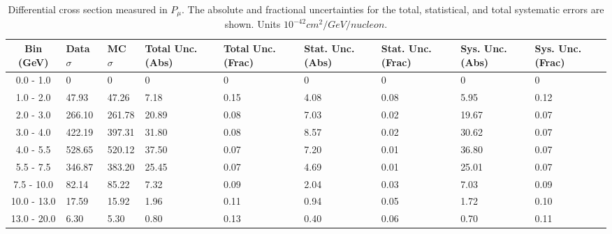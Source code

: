 \begin{table}[!htb]
    \centering
    \tiny
    \begin{tabular}{|c|p{0.5in}|p{0.5in}|p{0.5in}|p{0.5in}|p{0.5in}|p{0.5in}|p{0.5in}|p{0.5in}|}
        \hline
        Bin (GeV)& Data $\sigma$ & MC $\sigma$ & Total Unc. (Abs) & Total Unc. (Frac)  & Stat. Unc. (Abs) & Stat. Unc. (Frac) & Sys. Unc. (Abs) & Sys. Unc. (Frac)\\ \hline
0.0 - 1.0 & 0 & 0 & 0 & 0 & 0 & 0 & 0 & 0\\ \hline
1.0 - 2.0 & 47.93 & 47.26 & 7.18 & 0.15 & 4.08 & 0.08 & 5.95 & 0.12\\ \hline
2.0 - 3.0 & 266.10 & 261.78 & 20.89 & 0.08 & 7.03 & 0.02 & 19.67 & 0.07\\ \hline
3.0 - 4.0 & 422.19 & 397.31 & 31.80 & 0.08 & 8.57 & 0.02 & 30.62 & 0.07\\ \hline
4.0 - 5.5 & 528.65 & 520.12 & 37.50 & 0.07 & 7.20 & 0.01 & 36.80 & 0.07\\ \hline
5.5 - 7.5 & 346.87 & 383.20 & 25.45 & 0.07 & 4.69 & 0.01 & 25.01 & 0.07\\ \hline
7.5 - 10.0 & 82.14 & 85.22 & 7.32 & 0.09 & 2.04 & 0.03 & 7.03 & 0.09\\ \hline
10.0 - 13.0 & 17.59 & 15.92 & 1.96 & 0.11 & 0.94 & 0.05 & 1.72 & 0.10\\ \hline
13.0 - 20.0 & 6.30 & 5.30 & 0.80 & 0.13 & 0.40 & 0.06 & 0.70 & 0.11\\ \hline


    \end{tabular}
    \caption{Differential cross section measured in $P_\mu$. The absolute and fractional uncertainties for the total, statistical, and total systematic errors are shown. Units $10^{-42}cm^2/GeV/nucleon$.}
    \label{tab:ApdxA:XSecTable1Dpmu}
\end{table}

